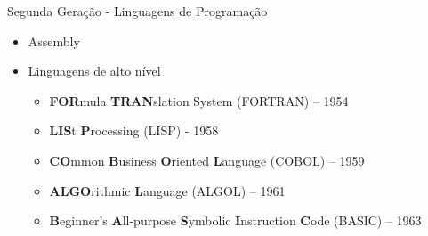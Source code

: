\documentclass[aspectratio=169,
				xcolor=table]{beamer}
\begin{document}
	\begin{frame}{Segunda Geração - Linguagens de Programação}
		\begin{itemize}
			\item Assembly
			\vspace{1em}
			\item Linguagens de alto nível
			\begin{itemize}
				\item \textbf{FOR}mula \textbf{TRAN}slation System (FORTRAN) – 1954 
				\item \textbf{LIS}t \textbf{P}rocessing (LISP) - 1958
				\item \textbf{CO}mmon \textbf{B}usiness \textbf{O}riented \textbf{L}anguage (COBOL) – 1959 
				\item \textbf{ALGO}rithmic \textbf{L}anguage  (ALGOL) – 1961 
				\item \textbf{B}eginner's \textbf{A}ll-purpose \textbf{S}ymbolic \textbf{I}nstruction \textbf{C}ode (BASIC) – 1963 
			\end{itemize}
		\end{itemize}
	\end{frame}
	
\end{document}
